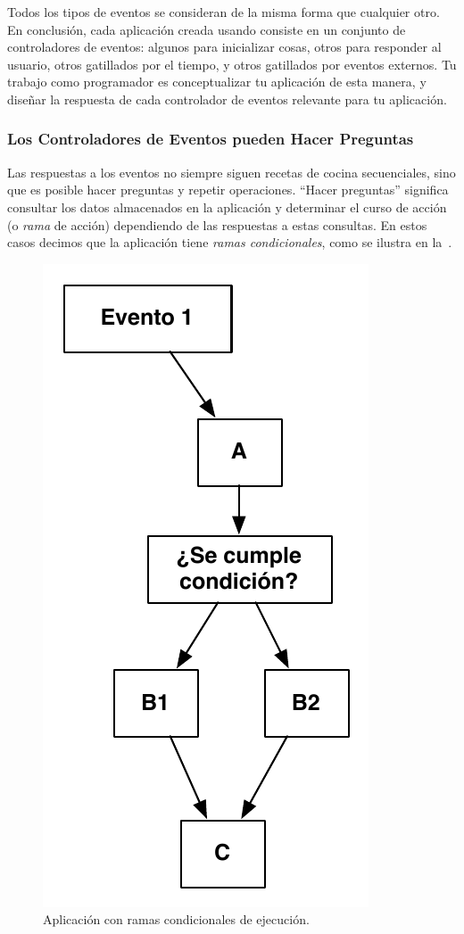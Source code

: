 \documentclass[letterpaper]{article}
\begin{document}
Todos los tipos de eventos se consideran de la misma forma que
cualquier otro. En conclusión, cada aplicación creada usando
\AppInventor consiste en un conjunto de controladores de eventos:
algunos para inicializar cosas, otros para responder al usuario, otros
gatillados por el tiempo, y otros gatillados por eventos externos. Tu
trabajo como programador es conceptualizar tu aplicación de esta
manera, y diseñar la respuesta de cada controlador de eventos
relevante para tu aplicación.

\subsubsection*{Los Controladores de Eventos pueden Hacer Preguntas}
Las respuestas a los eventos no siempre siguen recetas de cocina
secuenciales, sino que es posible hacer preguntas y repetir
operaciones. ``Hacer preguntas'' significa consultar los datos
almacenados en la aplicación y determinar el curso de acción (o
\emph{rama} de acción) dependiendo de las respuestas a estas
consultas. En estos casos decimos que la aplicación tiene \emph{ramas
  condicionales}, como se ilustra en la~.

\begin{figure}[H]
\centering
\includegraphics[scale=0.5]{figures/Conditionals}
\caption{Aplicación con ramas condicionales de ejecución.}
\label{fig:conditionals}
\end{figure}
\end{document}

